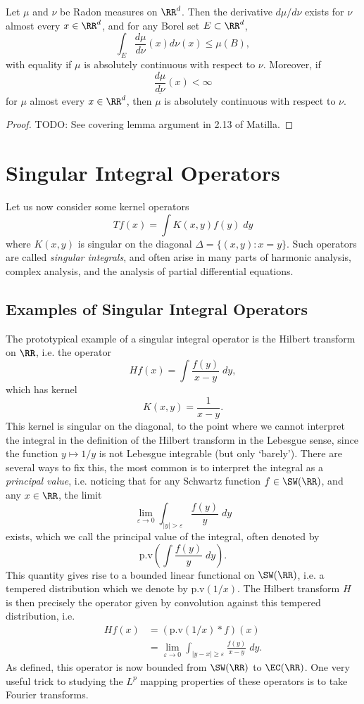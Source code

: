 \begin{theorem}
    Let $\mu$ and $\nu$ be Radon measures on $\RR^d$. Then the derivative $d\mu / d\nu$ exists for $\nu$ almost every $x \in \RR^d$, and for any Borel set $E \subset \RR^d$,
    \[ \int_E \frac{d\mu}{d\nu}(x) d\nu(x) \leq \mu(B), \]
    with equality if $\mu$ is absolutely continuous with respect to $\nu$. Moreover, if
    \[ \underline{\frac{d\mu}{d\nu}}(x) < \infty \]
    for $\mu$ almost every $x \in \RR^d$, then $\mu$ is absolutely continuous with respect to $\nu$.
\end{theorem}
\begin{proof}
    TODO: See covering lemma argument in 2.13 of Matilla.
\end{proof}




\chapter{Singular Integral Operators}

Let us now consider some kernel operators
%
\[ Tf(x) = \int K(x,y) f(y)\; dy \]
%
where $K(x,y)$ is singular on the diagonal $\Delta = \{ (x,y) : x = y \}$. Such operators are called \emph{singular integrals}, and often arise in many parts of harmonic analysis, complex analysis, and the analysis of partial differential equations.

\section{Examples of Singular Integral Operators}

The prototypical example of a singular integral operator is the Hilbert transform on $\RR$, i.e. the operator
%
\[ Hf(x) = \int \frac{f(y)}{x - y}\; dy, \]
%
which has kernel
%
\[ K(x,y) = \frac{1}{x - y}. \]
%
This kernel is singular on the diagonal, to the point where we cannot interpret the integral in the definition of the Hilbert transform in the Lebesgue sense, since the function $y \mapsto 1/y$ is not Lebesgue integrable (but only `barely'). There are several ways to fix this, the most common is to interpret the integral as a \emph{principal value}, i.e. noticing that for any Schwartz function $f \in \SW(\RR)$, and any $x \in \RR$, the limit
%
\[ \lim_{\varepsilon \to 0} \int_{|y| > \varepsilon} \frac{f(y)}{y}\; dy \]
%
exists, which we call the principal value of the integral, often denoted by
%
\[ \text{p.v} \left( \int \frac{f(y)}{y}\; dy \right). \]
%
This quantity gives rise to a bounded linear functional on $\SW(\RR)$, i.e. a tempered distribution which we denote by $\text{p.v}(1/x)$. The Hilbert transform $H$ is then precisely the operator given by convolution against this tempered distribution, i.e.
%
\begin{align*}
    Hf(x) &= (\text{p.v}(1/x) * f)(x)\\
    &= \lim_{\varepsilon \to 0} \int_{|y - x| \geq \varepsilon} \frac{f(y)}{x - y}\; dy.
\end{align*}
%
As defined, this operator is now bounded from $\SW(\RR)$ to $\EC(\RR)$. One very useful trick to studying the $L^p$ mapping properties of these operators is to take Fourier transforms.

